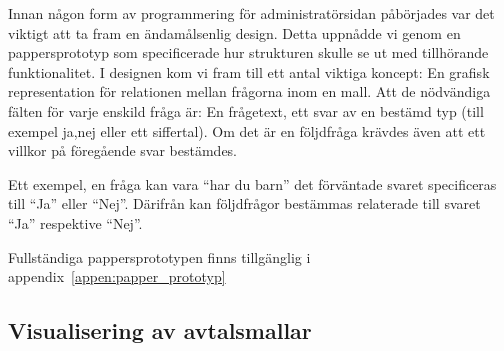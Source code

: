 \documentclass[a4paper,12pt]{article}
\begin{document}
Innan någon form av programmering för administratörsidan påbörjades var det viktigt att ta fram en ändamålsenlig design. Detta uppnådde vi genom en pappersprototyp som specificerade hur strukturen skulle se ut med tillhörande funktionalitet. I designen kom vi fram till ett antal viktiga koncept: En grafisk representation för relationen mellan frågorna inom en mall. Att de nödvändiga fälten för varje enskild fråga är: En frågetext, ett svar av en bestämd typ (till exempel ja,nej eller ett siffertal). Om det är en följdfråga krävdes även att ett villkor på föregående svar bestämdes. 

Ett exempel, en fråga kan vara ``har du barn'' det förväntade svaret specificeras till ``Ja'' eller ``Nej''. Därifrån kan följdfrågor bestämmas relaterade till svaret ``Ja'' respektive ``Nej''.

Fullständiga pappersprototypen finns tillgänglig i appendix~\ref{appen:papper_prototyp}
\subsection{Visualisering av avtalsmallar}
\label{sec:fragetrad:react}
\newcommand{\sequence}{\mbox{Sequence}}
\newcommand{\choice}{\mbox{Choice}}
\newcommand{\node}{\mbox{Square}}
\end{document}
